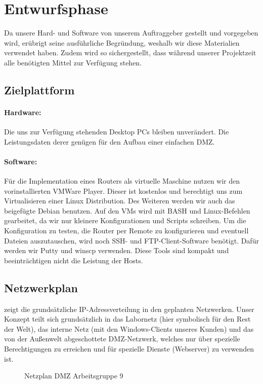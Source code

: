 \section{Entwurfsphase} 
\label{sec:Entwurfsphase}

Da unsere Hard- und Software von unserem Auftraggeber gestellt und vorgegeben wird, erübrigt seine ausführliche Begründung, weshalb wir diese Materialien verwendet haben. Zudem wird so sichergestellt, dass während unserer Projektzeit alle benötigten Mittel zur Verfügung stehen.

\subsection{Zielplattform}
\label{sec:Zielplattform}

\paragraph*{Hardware: } 
Die uns zur Verfügung stehenden Desktop PCs bleiben unverändert. Die Leistungsdaten derer  genügen für den Aufbau einer einfachen DMZ.

\paragraph*{Software: } 
Für die Implementation eines Routers als virtuelle Maschine nutzen wir den vorinstallierten VMWare Player. Dieser ist kostenlos und berechtigt uns zum Virtualisieren einer Linux Distribution. Des Weiteren werden wir auch das beigefügte Debian benutzen. Auf den VMs wird mit BASH und Linux-Befehlen gearbeitet, da wir nur kleinere Konfigurationen und Scripts schreiben. Um die Konfiguration zu testen, die Router per Remote zu konfigurieren und eventuell Dateien auszutauschen, wird noch SSH- und FTP-Client-Software benötigt. Dafür werden wir Putty und winscp verwenden. Diese Tools sind kompakt und beeinträchtigen nicht die Leistung der Hosts.

\subsection{Netzwerkplan}
\label{sec:Geschaeftslogik}

 zeigt die grundsätzliche IP-Adressverteilung in den geplanten Netzwerken. 
Unser Konzept teilt sich grundsätzlich in das Labornetz (hier symbolisch für den Rest der Welt), das interne Netz (mit den Windows-Clients unseres Kunden) und das von der Außenwelt abgeschottete \ac{DMZ}-Netzwerk, welches nur über spezielle Berechtigungen zu erreichen und für spezielle Dienste (Webserver) zu verwenden ist.
\begin{figure}[htb]
\centering
{}
\caption{Netzplan DMZ Arbeitsgruppe 9}
\label{fig:Netzplan}
\end{figure}


